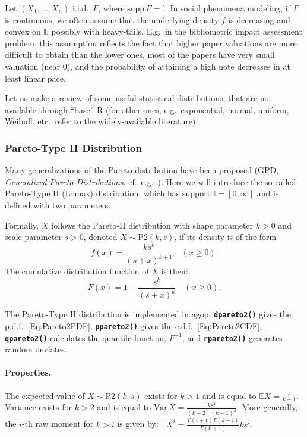 \documentclass[11pt]{article}\usepackage[]{graphicx}\usepackage[]{color}
\newcommand{\hlkwd}[1]{\textcolor[rgb]{0.737,0.353,0.396}{\textbf{#1}}}%
\newcommand{\package}[1]{\textsf{#1}\xspace}
\newcommand{\lang}[1]{\textsf{#1}\xspace}
\newcommand{\R}{\lang{R}}
\newcommand{\Rfunc}[1]{\texttt{\hlkwd{#1}}}
\newcommand{\Ival}{\mathbb{I}}
\theoremstyle{remark}
\theoremstyle{definition}
\begin{document}
Let $(X_1,\dots,X_n)$ i.i.d.~$F$, where $\mathrm{supp}\,F = \Ival$.
In social phenomena modeling, if $F$ is continuous,
we often assume that the underlying density $f$ is decreasing
and convex on $\Ival$, possibly with heavy-tails.
E.g.~in the bibliometric impact assessment problem,
this assumption reflects the fact that higher paper valuations
are more difficult to obtain than the lower ones,
most of the papers have very small valuation (near $0$),
and the probability of attaining a high note decreases in at least
linear pace.

Let us make a review of some useful statistical
distributions, that are not available through ``base'' \R
(for other ones, e.g.~exponential, normal, uniform, Weibull, etc.~refer
to the widely-available literature).



\subsubsection{Pareto-Type II Distribution}

Many generalizations of the Pareto distribution
have been proposed (GPD, \textit{Generalized Pareto Distributions},
cf.~e.g.~\cite{VillasenorGonzalez2009:gofgpd,Zhang2010:estgpd}).
Here we will introduce the so-called Pareto-Type II (Lomax) distribution,
which has support $\Ival=[0,\infty]$
and is defined with two parameters.


Formally, $X$ follows the Pareto-II distribution
with shape parameter $k>0$ and scale parameter $s>0$,
denoted $X\sim\mathrm{P2}(k,s)$, if its density is of the form
\begin{equation}\label{Eq:Pareto2PDF}
   f(x)=\frac{k s^k}{(s+x)^{k+1}}\quad (x\ge 0).
\end{equation}
The cumulative distribution function of $X$ is then:
\begin{equation}\label{Eq:Pareto2CDF}
   F(x) = 1-\dfrac{s^k}{(s+x)^k}\quad (x\ge 0).
\end{equation}

The Pareto-Type II distribution
is implemented in \package{agop}:
\index{\Rfunc{dpareto2()}}\Rfunc{dpareto2()} gives the p.d.f.~\eqref{Eq:Pareto2PDF},
\index{\Rfunc{ppareto2()}}\Rfunc{ppareto2()} gives the c.d.f.~\eqref{Eq:Pareto2CDF},
\index{\Rfunc{qpareto2()}}\Rfunc{qpareto2()} calculates the quantile function, $F^{-1}$,
and \index{\Rfunc{rpareto2()}}\Rfunc{rpare\-to2()} generates random deviates.

\paragraph{Properties.}
The expected value of $X\sim\mathrm{P2}(k,s)$
exists for $k>1$ and is equal to
\(\mathbb{E}X = \frac{s}{k-1}.\)
Variance exists for $k>2$ and is equal to
\(\mathrm{Var}\, X = \frac{ks^2}{(k-2)(k-1)^2}.\)
More generally, the $i$-th raw moment for $k>i$ is given by:
\(\mathbb{E}X^i = \frac{\Gamma(i+1)\Gamma(k-i)}{\Gamma(k+1)} ks^i.\)
\end{document}
